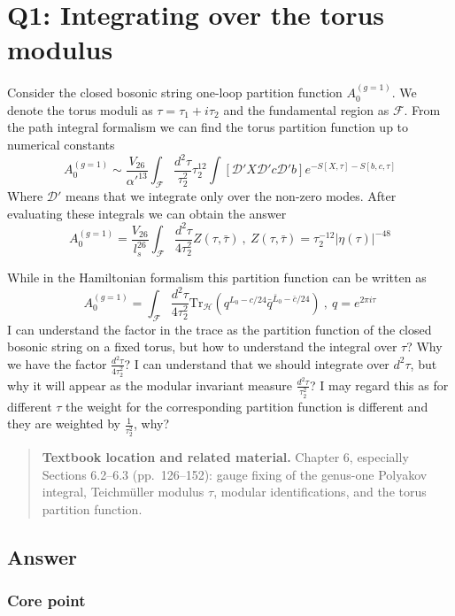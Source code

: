 \documentclass[
  10pt,
  a4paper,
  openany]{book}
\begin{document}
\section{Q1: Integrating over the torus
modulus}\label{q1-integrating-over-the-torus-modulus}

Consider the closed bosonic string one-loop partition function
\(A_{0}^{(g=1)}\). We denote the torus moduli as
\(\tau=\tau_{1}+i\tau_{2}\) and the fundamental region as
\(\mathcal{F}\). From the path integral formalism we can find the torus
partition function up to numerical constants \[
A_{0}^{(g=1)}\sim \frac{V_{26}}{\alpha'^{13}}\int_{\mathcal{F}} \frac{d^2\tau}{\tau_{2}^2} \tau_{2}^{12}\int [\mathcal{D'}X\mathcal{D'}c\mathcal{D'}b ]e^{-S[X,\tau]-S[b,c,\tau]}
\] Where \(\mathcal{D'}\) means that we integrate only over the non-zero
modes. After evaluating these integrals we can obtain the answer \[
A_{0}^{(g=1)}= \frac{V_{26}}{l_{s}^{26}}\int_{\mathcal{F}} \frac{d^2\tau}{4\tau_{2}^2}Z(\tau,\bar{\tau}) \ , \ Z(\tau ,\bar{\tau})=\tau_{2}^{-12}|\eta(\tau)|^{-48}
\]

While in the Hamiltonian formalism this partition function can be
written as \[
A_{0}^{(g=1)}=\int_{\mathcal{F}} \frac{d^2\tau}{4\tau_{2}^2} \mathrm{Tr}_{\mathcal{H}}(q^{L_{0}-c/24}\bar{q}^{\bar{L}_{0}-\bar{c}/24}) \ , \ q=e^{2\pi i\tau}
\] I can understand the factor in the trace as the partition function of
the closed bosonic string on a fixed torus, but how to understand the
integral over \(\tau\)? Why we have the factor
\(\frac{d^2\tau}{4\tau_{2}^2}\)? I can understand that we should
integrate over \(d^2\tau\), but why it will appear as the modular
invariant measure \(\frac{d^2\tau}{\tau_{2}^2}\)? I may regard this as
for different \(\tau\) the weight for the corresponding partition
function is different and they are weighted by \(\frac{1}{\tau_{2}^2}\),
why?

\begin{quote}
\textbf{Textbook location and related material.} Chapter 6, especially
Sections 6.2--6.3 (pp.~126--152): gauge fixing of the genus-one Polyakov
integral, Teichmüller modulus \(\tau\), modular identifications, and the
torus partition function.
\end{quote}

\subsection{Answer}\label{answer}

\subsubsection{Core point}\label{core-point}
\end{document}
